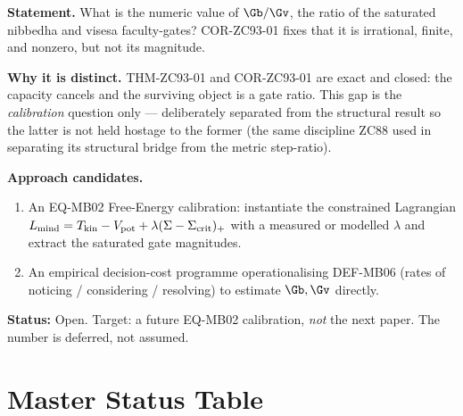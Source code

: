 \documentclass[12pt, a4paper]{article}
\begin{document}
\begin{openqbox}[title={GAP-ZC93-01: The Value of the Gate Ratio
  (Priority~3; future EQ-MB02 calibration)}]
\textbf{Statement.} What is the numeric value of $\Gb/\Gv$, the ratio of the
saturated nibbedha and visesa faculty-gates? COR-ZC93-01 fixes that it is
irrational, finite, and nonzero, but not its magnitude.

\textbf{Why it is distinct.} THM-ZC93-01 and COR-ZC93-01 are exact and closed:
the capacity cancels and the surviving object is a gate ratio. This gap is the
\emph{calibration} question only --- deliberately separated from the structural
result so the latter is not held hostage to the former (the same discipline
ZC88 used in separating its structural bridge from the metric step-ratio).

\textbf{Approach candidates.}
\begin{enumerate}[leftmargin=2em, noitemsep]
  \item An EQ-MB02 Free-Energy calibration: instantiate the constrained
    Lagrangian $L_{\rm mind}=T_{\rm kin}-V_{\rm pot}+\lambda(\Sigma-
    \Sigma_{\rm crit})_+$ with a measured or modelled $\lambda$ and extract the
    saturated gate magnitudes.
  \item An empirical decision-cost programme operationalising DEF-MB06 (rates
    of noticing / considering / resolving) to estimate $\Gb,\Gv$ directly.
\end{enumerate}
\textbf{Status:} Open. Target: a future EQ-MB02 calibration, \emph{not} the
next paper. The number is deferred, not assumed.
\end{openqbox}

\section{Master Status Table}
\end{document}

